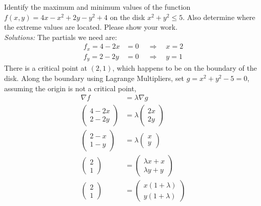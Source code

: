    \fi
    
\fi






\ifnum {}

    \question[6] Identify the maximum and minimum values of the function $f(x,y) = 4x - x^2 + 2y - y^2  + 4$ on the disk $x^2+y^2 \le 5$. Also determine where the extreme values are located. Please show your work. 
    \ifnum {} {\color{DarkBlue} \\ \textit{Solutions:} The partials we need are: 
    \begin{align*}
        f_x = 4 - 2x &=0 \ \quad \Rightarrow \quad x= 2 \\
        f_y = 2 - 2y &=0 \ \quad \Rightarrow \quad y= 1 
    \end{align*}
    There is a critical point at $(2,1)$, which happens to be on the boundary of the disk. Along the boundary using Lagrange Multipliers, set $g = x^2 + y^2 - 5 = 0$, assuming the origin is not a critical point,
    \begin{align*}
        \nabla f &= \lambda \nabla g \\
        \begin{pmatrix} 4 - 2x \\ 2 - 2y \end{pmatrix} &= \lambda \begin{pmatrix} 2x\\2y \end{pmatrix} \\ 
        \begin{pmatrix} 2 - x \\ 1 - y \end{pmatrix} &= \lambda \begin{pmatrix} x\\y \end{pmatrix} \\ 
        \begin{pmatrix} 2 \\ 1 \end{pmatrix} &= \begin{pmatrix} \lambda x + x\\ \lambda y + y \end{pmatrix} \\ 
        \begin{pmatrix} 2 \\ 1 \end{pmatrix} &= \begin{pmatrix} x(1 + \lambda )\\  y( 1 + \lambda) \end{pmatrix} \\ 

\end{align*}}
